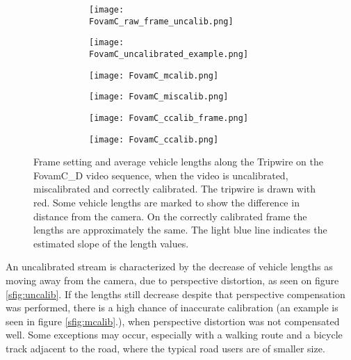 \begin{figure}[!t]
	\centering
	\begin{subfigure}[b]{\textwidth}
		\begin{subfigure}[t]{0.45\textwidth}
		\texttt{[image: FovamC\_raw\_frame\_uncalib.png]}
		\end{subfigure}
	\quad
		\begin{subfigure}[t]{0.375\textwidth}
		\texttt{[image: FovamC\_uncalibrated\_example.png]}
		\end{subfigure}
	\end{subfigure}
	\hfill
	\begin{subfigure}[b]{\textwidth}
		\begin{subfigure}[t]{0.45\textwidth}
			\texttt{[image: FovamC\_mcalib.png]}
		\end{subfigure}
		\quad
		\begin{subfigure}[t]{0.375\textwidth}
			\texttt{[image: FovamC\_miscalib.png]}
		\end{subfigure}
	\end{subfigure}
	\hfill
	\begin{subfigure}[b]{\textwidth}
		\begin{subfigure}[t]{0.45\textwidth}
			\texttt{[image: FovamC\_ccalib\_frame.png]}
		\end{subfigure}
		\quad
		\begin{subfigure}[t]{0.375\textwidth}
			\texttt{[image: FovamC\_ccalib.png]}
		\end{subfigure}
	\end{subfigure}

	\caption{Frame setting and average vehicle lengths along the Tripwire on the FovamC\_D video sequence, when the video is uncalibrated, miscalibrated and correctly calibrated. The tripwire is drawn with red. Some vehicle lengths are marked to show the difference in distance from the camera. On the correctly calibrated frame the lengths are approximately the same. The light blue line indicates the estimated slope of the length values.\label{fig:calibration_versions}}
\end{figure}

An uncalibrated stream is characterized by the decrease of vehicle lengths as moving away from the camera, due to perspective distortion, as seen on figure \ref{sfig:uncalib}.
If the lengths still decrease despite that perspective compensation was performed, there is a high chance of inaccurate calibration (an example is seen in figure \ref{sfig:mcalib}.), when perspective distortion was not compensated well.
Some exceptions may occur, especially with a walking route and a bicycle track adjacent to the road, where the typical road users are of smaller size.

